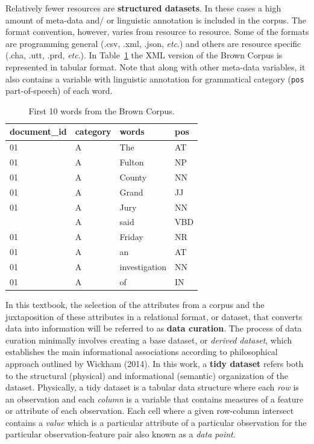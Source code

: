 \documentclass[
  letterpaper,
]{scrbook}
\begin{document}
Relatively fewer resources are \textbf{structured datasets}. In these
cases a high amount of meta-data and/ or linguistic annotation is
included in the corpus. The format convention, however, varies from
resource to resource. Some of the formats are programming general (.csv,
.xml, .json, \emph{etc}.) and others are resource specific (.cha, .utt,
.prd, \emph{etc}.). In Table~\ref{tbl-structure-brown} the XML version
of the Brown Corpus is represented in tabular format. Note that along
with other meta-data variables, it also contains a variable with
linguistic annotation for grammatical category (\texttt{pos}
part-of-speech) of each word.

\hypertarget{tbl-structure-brown}{}
\begin{table}
\caption{\label{tbl-structure-brown}First 10 words from the Brown Corpus. }\tabularnewline

\centering
\begin{tabular}{llll}
\toprule
document\_id & category & words & pos\\
\midrule
01 & A & The & AT\\
01 & A & Fulton & NP\\
01 & A & County & NN\\
01 & A & Grand & JJ\\
01 & A & Jury & NN\\
\addlinespace
01 & A & said & VBD\\
01 & A & Friday & NR\\
01 & A & an & AT\\
01 & A & investigation & NN\\
01 & A & of & IN\\
\bottomrule
\end{tabular}
\end{table}

In this textbook, the selection of the attributes from a corpus and the
juxtaposition of these attributes in a relational format, or dataset,
that converts data into information will be referred to as \textbf{data
curation}. The process of data curation minimally involves creating a
base dataset, or \emph{derived dataset}, which establishes the main
informational associations according to philosophical approach outlined
by Wickham (2014). In this work, a \textbf{tidy dataset} refers both to
the structural (physical) and informational (semantic) organization of
the dataset. Physically, a tidy dataset is a tabular data structure
where each \emph{row} is an observation and each \emph{column} is a
variable that contains measures of a feature or attribute of each
observation. Each cell where a given row-column intersect contains a
\emph{value} which is a particular attribute of a particular observation
for the particular observation-feature pair also known as a \emph{data
point}.
\end{document}
